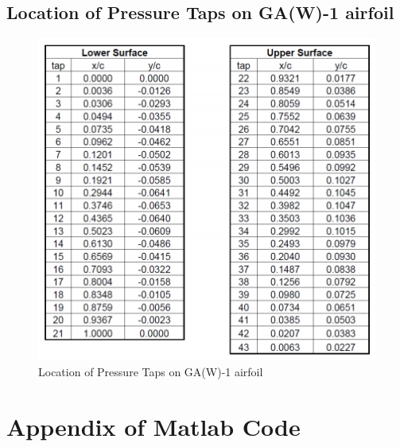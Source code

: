 \documentclass[12pt]{article}
\begin{document}
\subsection{Location of Pressure Taps on GA(W)-1 airfoil}
    \begin{figure}[h]
        \includegraphics[width=10 cm]{location.PNG}
        \centering
        \caption{Location of Pressure Taps on GA(W)-1 airfoil}
    \end{figure}
\newpage


\section{Appendix of Matlab Code}
\end{document}
